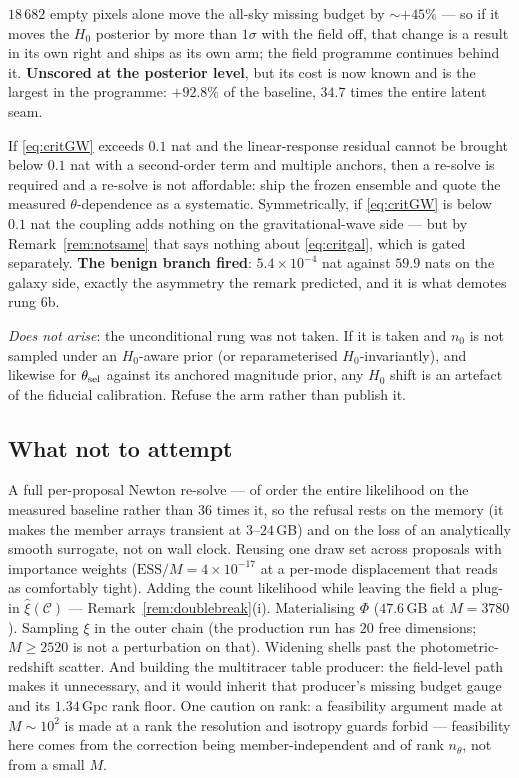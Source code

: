 \documentclass[11pt]{article}
\theoremstyle{definition}
\theoremstyle{remark}
\newcommand{\ESS}{\mathrm{ESS}}
\begin{document}
\begin{description}[leftmargin=2.1em,style=nextline,itemsep=1pt]
$18\,682$ empty pixels alone move the all-sky missing budget by $\sim+45\%$ --- so if
it moves the $H_0$ posterior by more than $1\sigma$ with the field off, that change
is a result in its own right and ships as its own arm; the field programme continues
behind it. \textbf{Unscored at the posterior level}, but its cost is now known and
is the largest in the programme: $+92.8\%$ of the baseline, $34.7$ times the
entire latent seam.
\item[K9 (day 14).] If \eqref{eq:critGW} exceeds $0.1$ nat and the linear-response
residual cannot be brought below $0.1$ nat with a second-order term and multiple
anchors, then a re-solve is required and a re-solve is not affordable: ship the
frozen ensemble and quote the measured $\theta$-dependence as a systematic.
Symmetrically, if \eqref{eq:critGW} is below $0.1$ nat the coupling adds nothing on
the gravitational-wave side --- but by Remark~\ref{rem:notsame} that says nothing
about \eqref{eq:critgal}, which is gated separately. \textbf{The benign branch
fired}: $5.4\times10^{-4}$ nat against $59.9$ nats on the galaxy side, exactly the
asymmetry the remark predicted, and it is what demotes rung 6b.
\item[K10.] \emph{Does not arise}: the unconditional rung was not taken. If it is
taken and $n_0$ is not sampled under an
$H_0$-aware prior (or reparameterised $H_0$-invariantly), and likewise for
$\theta_{\rm sel}$ against its anchored magnitude prior, any $H_0$ shift is an
artefact of the fiducial calibration. Refuse the arm rather than publish it.
\end{description}

\subsection{What not to attempt}

A full per-proposal Newton re-solve --- of order the entire likelihood on the
measured baseline rather than $36$ times it, so the refusal rests on the memory
(it makes the member arrays transient at $3$--$24$\,GB) and on the loss of an
analytically smooth surrogate, not on wall clock. Reusing one draw set across proposals with
importance weights ($\ESS/M=4\times10^{-17}$ at a per-mode displacement that reads as
comfortably tight). Adding the count likelihood while leaving the field a plug-in
$\hat\xi(\mathcal C)$ --- Remark~\ref{rem:doublebreak}(i). Materialising $\Phi$
($47.6$\,GB at $M=3780$). Sampling $\xi$ in the outer chain (the production run has
$20$ free dimensions; $M\ge2520$ is not a perturbation on that). Widening shells past
the photometric-redshift scatter. And building the multitracer table producer: the
field-level path makes it unnecessary, and it would inherit that producer's missing
budget gauge and its $1.34$\,Gpc rank floor. One caution on rank: a feasibility
argument made at $M\sim10^2$ is made at a rank the resolution and isotropy guards
forbid --- feasibility here comes from the correction being member-independent and of
rank $n_\theta$, not from a small $M$.
\end{document}
